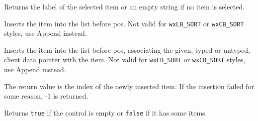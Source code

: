 \label{wxcontrolwithitemsgetstringselection}


Returns the label of the selected item or an empty string if no item is
selected.




\label{wxcontrolwithitemsinsert}


Inserts the item into the list before pos.
Not valid for {\tt wxLB\_SORT} or {\tt wxCB\_SORT} styles, use Append instead.



Inserts the item into the list before pos, associating the given, typed or
untyped, client data pointer with the item.
Not valid for {\tt wxLB\_SORT} or {\tt wxCB\_SORT} styles, use Append instead.






The return value is the index of the newly inserted item. If the insertion failed
for some reason, -1 is returned.


\label{wxcontrolwithitemsisempty}


Returns {\tt true} if the control is empty or {\tt false} if it has some items.




\label{wxcontrolwithitemsnumber}

